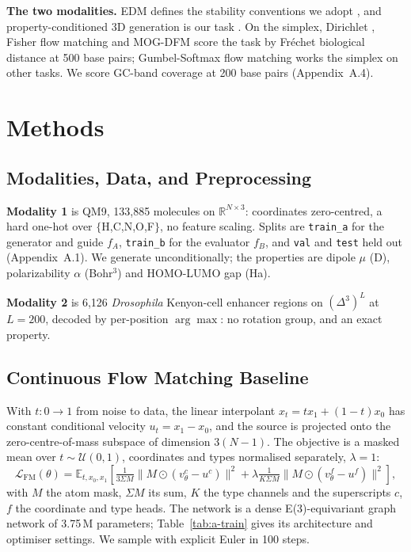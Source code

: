 \textbf{The two modalities.} EDM defines the stability conventions we adopt
\citep{hoogeboom2022equivariant}, and property-conditioned 3D generation is our task
\citep{bao2023eegsde,xu2022geodiff,irwin2024semlaflow,song2023equifm}. On the simplex,
Dirichlet \citep{stark2024dirichlet}, Fisher \citep{davis2024fisher} flow matching and
MOG-DFM \citep{chen2025mogdfm} score the task by Fr\'echet biological distance at 500
base pairs; Gumbel-Softmax flow matching \citep{tang2025gumbel} works the simplex on
other tasks. We score GC-band coverage at 200 base pairs (Appendix~A.4).

\section{Methods}

\subsection{Modalities, Data, and Preprocessing}
\label{sec:data}

\textbf{Modality 1} is QM9, 133{,}885 molecules on $\mathbb{R}^{N\times3}$: coordinates
zero-centred, a hard one-hot over $\{$H,C,N,O,F$\}$, no feature scaling. Splits are \texttt{train\_a} for the generator and guide $f_A$,
\texttt{train\_b} for the evaluator $f_B$, and \texttt{val} and \texttt{test} held out
(Appendix~A.1). We generate unconditionally; the properties are dipole
$\mu$ (D), polarizability $\alpha$ (Bohr$^3$) and HOMO-LUMO gap (Ha).

\textbf{Modality 2} is 6{,}126 \emph{Drosophila} Kenyon-cell enhancer regions
\citep{chen2025mogdfm} on $(\Delta^3)^L$ at $L{=}200$, decoded by per-position
$\arg\max$: no rotation group, and an exact property.

\subsection{Continuous Flow Matching Baseline}
\label{sec:fm}

With $t:0\to1$ from noise to data, the linear interpolant $x_t = t x_1 + (1-t) x_0$ has
constant conditional velocity $u_t=x_1-x_0$, and the source is projected onto the
zero-centre-of-mass subspace of dimension $3(N-1)$. The objective is a masked mean over
$t\sim\mathcal{U}(0,1)$, coordinates and types normalised separately, $\lambda=1$:
\begin{equation}
\mathcal{L}_{\mathrm{FM}}(\theta)=
\mathbb{E}_{t,x_0,x_1}\!\left[
\tfrac{1}{3\Sigma M}\big\|M\odot(v^{c}_\theta - u^{c})\big\|^2
+\lambda\tfrac{1}{K\Sigma M}\big\|M\odot(v^{f}_\theta - u^{f})\big\|^2
\right],
\label{eq:fmloss}
\end{equation}
with $M$ the atom mask, $\Sigma M$ its sum, $K$ the type channels and the superscripts
$c$, $f$ the coordinate and type heads. The network is a dense E(3)-equivariant graph
network of 3.75\,M parameters; Table~\ref{tab:a-train} gives its architecture and
optimiser settings. We sample with explicit Euler in 100 steps.

